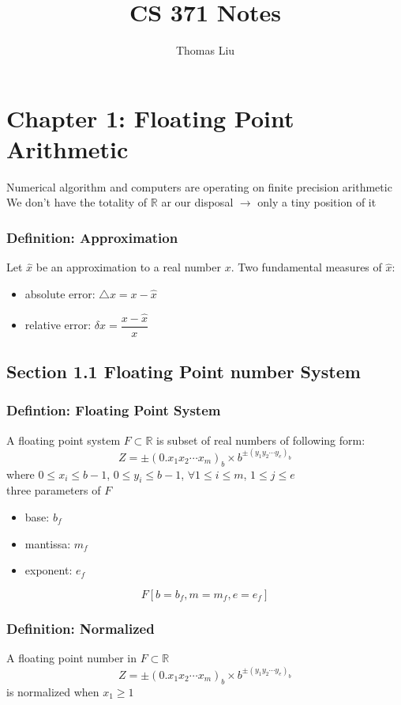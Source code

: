 \documentclass[11pt]{article}
\title{CS 371 Notes}
\author{Thomas Liu}
\newcommand{\R}{{\mathbb{R}}}
\begin{document}
\maketitle
\tableofcontents

\newpage 

\section{Chapter 1: Floating Point Arithmetic}
Numerical algorithm and computers are operating on finite precision arithmetic \\
We don't have the totality of $\R$ ar our disposal $\rightarrow$ only a tiny position of it 
\subsubsection{Definition: Approximation}
Let $\hat{x}$ be an approximation to a real number $x$. Two fundamental measures of $\hat{x}$:
\begin{itemize}
  \item absolute error: $\triangle x = x - \hat{x}$
  \item relative error: $\delta x = \dfrac{x-\hat{x}}{x}$
\end{itemize}
\subsection{Section 1.1 Floating Point number System}
\subsubsection{Defintion: Floating Point System}
A floating point system $F\subset\R$ is subset of real numbers of following form:
\[Z=\pm(0.x_1x_2\cdots x_m)_b\times b^{\pm(y_1y_2\cdots y_e)_b}\]
where $0\leq x_i\leq b-1$, $0\leq y_i\leq b-1$, $\forall1\leq i\leq m$, $1\leq j\leq e$\\
three parameters of $F$
\begin{itemize}
  \item base: $b_f$
  \item mantissa: $m_f$
  \item exponent: $e_f$
\end{itemize}
\[F[b=b_f, m=m_f, e=e_f]\]
\subsubsection{Definition: Normalized}
A floating point number in $F\subset\R$
\[Z=\pm(0.x_1x_2\cdots x_m)_b\times b^{\pm(y_1y_2\cdots y_e)_b}\]
is normalized when $x_1\geq1$
\end{document}
